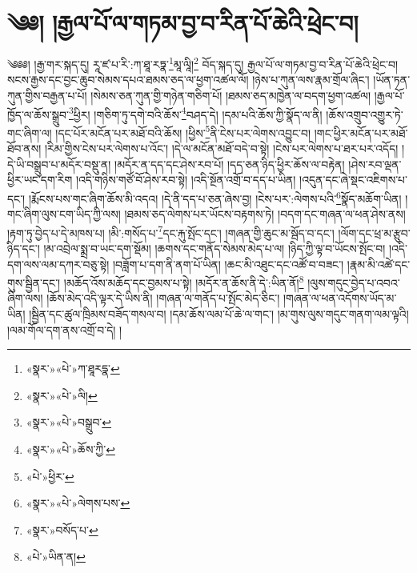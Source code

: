 \documentclass[12pt,a4paper]{book}
\begin{document}
\chapter{༄༅། །རྒྱལ་པོ་ལ་གཏམ་བྱ་བ་རིན་པོ་ཆེའི་ཕྲེང་བ།}༄༅༅། །རྒྱ་གར་སྐད་དུ། རཱ་ཛ་པ་རི་:ཀ་ཐཱ་རཏྣ་\footnote{«སྣར་»«པེ་»ཀ་ཐཱརདྣ་}མཱ་ལཱི།\footnote{«སྣར་»«པེ་»ལི།} བོད་སྐད་དུ། རྒྱལ་པོ་ལ་གཏམ་བྱ་བ་རིན་པོ་ཆེའི་ཕྲེང་བ། སངས་རྒྱས་དང་བྱང་ཆུབ་སེམས་དཔའ་ཐམས་ཅད་ལ་ཕྱག་འཚལ་ལོ། །ཉེས་པ་ཀུན་ལས་རྣམ་གྲོལ་ཞིང་། །ཡོན་ཏན་ཀུན་གྱིས་བརྒྱན་པ་པོ། །སེམས་ཅན་ཀུན་གྱི་གཉེན་གཅིག་པོ། །ཐམས་ཅད་མཁྱེན་ལ་བདག་ཕྱག་འཚལ། །རྒྱལ་པོ་ཁྱོད་ལ་ཆོས་སྒྲུབ་\footnote{«སྣར་»«པེ་»བསྒྲུབ་}ཕྱིར། །གཅིག་ཏུ་དགེ་བའི་ཆོས་\footnote{«སྣར་»«པེ་»ཆོས་ཀྱི་}བཤད་དེ། །དམ་པའི་ཆོས་ཀྱི་སྣོད་ལ་ནི། །ཆོས་འགྲུབ་འགྱུར་ཏེ་གང་ཞིག་ལ། །དང་པོར་མངོན་པར་མཐོ་བའི་ཆོས། །ཕྱིས་\footnote{«པེ་»ཕྱིར་}ནི་ངེས་པར་ལེགས་འབྱུང་བ། །གང་ཕྱིར་མངོན་པར་མཐོ་ཐོབ་ནས། །རིམ་གྱིས་ངེས་པར་ལེགས་པ་འོང་། །དེ་ལ་མངོན་མཐོ་བདེ་བ་སྟེ། །ངེས་པར་ལེགས་པ་ཐར་པར་འདོད། །དེ་ཡི་བསྒྲུབ་པ་མདོར་བསྡུ་ན། །མདོར་ན་དད་དང་ཤེས་རབ་པོ། །དད་ཅན་ཉིད་ཕྱིར་ཆོས་ལ་བརྟེན། །ཤེས་རབ་ལྡན་ཕྱིར་ཡང་དག་རིག །འདི་གཉིས་གཙོ་བོ་ཤེས་རབ་སྟེ། །འདི་སྔོན་འགྲོ་བ་དད་པ་ཡིན། །འདུན་དང་ཞེ་སྡང་འཇིགས་པ་དང་། །རྨོངས་པས་གང་ཞིག་ཆོས་མི་འདའ། །དེ་ནི་དད་པ་ཅན་ཞེས་བྱ། །ངེས་པར་:ལེགས་པའི་\footnote{«སྣར་»«པེ་»ལེགས་པས་}སྣོད་མཆོག་ཡིན། །གང་ཞིག་ལུས་ངག་ཡིད་ཀྱི་ལས། །ཐམས་ཅད་ལེགས་པར་ཡོངས་བརྟགས་ཏེ། །བདག་དང་གཞན་ལ་ཕན་ཤེས་ནས། །རྟག་ཏུ་བྱེད་པ་དེ་མཁས་པ། །མི་:གསོད་པ་\footnote{«སྣར་»བསོད་པ་}དང་རྐུ་སྤོང་དང་། །གཞན་གྱི་ཆུང་མ་སྦོད་བ་དང་། །ལོག་དང་ཕྲ་མ་རྩུབ་ཉིད་དང་། །མ་འབྲེལ་སྨྲ་བ་ཡང་དག་སྡོམ། །ཆགས་དང་གནོད་སེམས་མེད་པ་ལ། །ཉིད་ཀྱི་ལྟ་བ་ཡོངས་སྤོང་བ། །འདི་དག་ལས་ལམ་དཀར་བཅུ་སྟེ། །བཟློག་པ་དག་ནི་ནག་པོ་ཡིན། །ཆང་མི་འཐུང་དང་འཚོ་བ་བཟང་། །རྣམ་མི་འཚེ་དང་གུས་སྦྱིན་དང་། །མཆོད་འོས་མཆོད་དང་བྱམས་པ་སྟེ། །མདོར་ན་ཆོས་ནི་དེ་:ཡིན་ནོ།\footnote{«པེ་»ཡིན་ན།} །ལུས་གདུང་བྱེད་པ་འབའ་ཞིག་ལས། །ཆོས་མེད་འདི་ལྟར་དེ་ཡིས་ནི། །གཞན་ལ་གནོད་པ་སྤོང་མེད་ཅིང་། །གཞན་ལ་ཕན་འདོགས་ཡོད་མ་ཡིན། །སྦྱིན་དང་ཚུལ་ཁྲིམས་བཟོད་གསལ་བ། །དམ་ཆོས་ལམ་པོ་ཆེ་ལ་གང་། །མ་གུས་ལུས་གདུང་གནག་ལམ་ལྟའི། །ལམ་གོལ་དག་ནས་འགྲོ་བ་དེ། །
\end{document}
